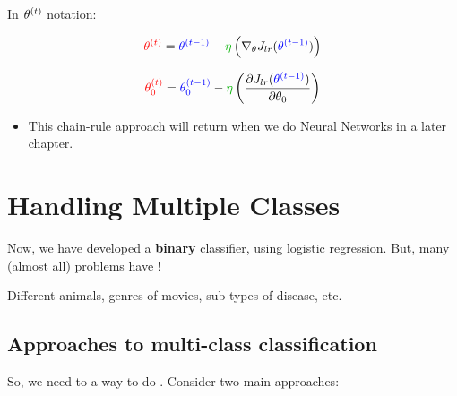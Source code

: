         In $\theta^{(t)}$ notation:
        
        \begin{equation}
            \red{ \ex{\theta}{t} } = \blu{ \ex{\theta}{t-1} } - \grn{\eta} 
            \left(
            \nabla_\theta J_{lr} (\blu{ \ex{\theta}{t-1} })
            \right)
        \end{equation}
        
        \begin{equation}
            \red{ \ex{\theta_0}{t} } = \blu{ \ex{\theta_0}{t-1} } - \grn{\eta} 
            \left(
                \pderiv{ J_{lr} (\blu{ \ex{\theta}{t-1} })}{\theta_0}
            \right)
        \end{equation}

        \begin{itemize}
            \item This chain-rule approach will return when we do Neural Networks in a later chapter. 
        \end{itemize}
        

\pagebreak

\section{Handling Multiple Classes}

    Now, we have developed a \textbf{binary} classifier, using logistic regression. But, many (almost all) problems have ! 
    
    \miniex Different animals, genres of movies, sub-types of disease, etc.
    
    \subsection{Approaches to multi-class classification}
        
        So, we need to a way to do . Consider two main approaches:
        
